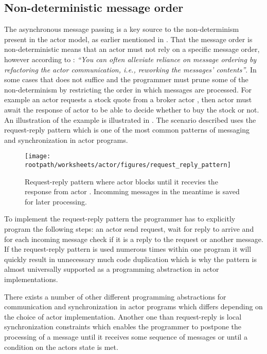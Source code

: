 \subsection{Non-deterministic message order}\label{ssec:nondeter_msg_order}
The asynchronous message passing is a key source to the non-determinism present in the actor model, as earlier mentioned in . That the message order is non-deterministic means that an actor must not rely on a specific message order, however according to \cite[p. 35]{haller2012actors}: \textit{``You can often alleviate reliance on message ordering by refactoring the actor communication, i.e., reworking the messages' contents''}. In some cases that does not suffice and the programmer must prune some of the non-determinism by restricting the order in which messages are processed. For example an actor  requests a stock quote from a broker actor , then actor  must await the response of actor  to be able to decide whether to buy the stock or not. An illustration of the example is illustrated in . The scenario described uses the request-reply pattern which is one of the most common patterns of messaging and synchronization in actor programs\cite[p. 5]{karmani2009actor}.

\begin{figure}[h!]
\centering
\texttt{[image: \\rootpath/worksheets/actor/figures/request\_reply\_pattern]}
\caption{Request-reply pattern where actor  blocks until it recevies the response from actor . Incomming messages in the meantime is saved for later processing.}\label{fig:request_reply_pattern}
\end{figure}

To implement the request-reply pattern the programmer has to explicitly program the following steps: an actor send request, wait for reply to arrive and for each incoming message check if it is a reply to the request or another message. If the request-reply pattern is used numerous times within one program it will quickly result in unnecessary much code duplication which is why the pattern is almost universally supported as a programming abstraction in actor implementations\cite[p. 5]{karmani2009actor}.

There exists a number of other different programming abstractions for communication and synchronization in actor programs which differs depending on the choice of actor implementation\cite[p. 6]{karmani2009actor}. Another one than request-reply is local synchronization constraints which enables the programmer to postpone the processing of a message until it receives some sequence of messages or until a condition on the actors state is met.


